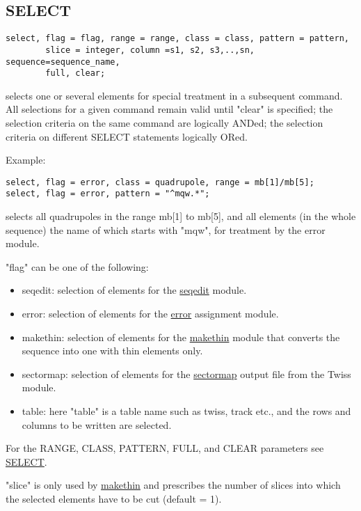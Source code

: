 \subsection{SELECT} %
\begin{verbatim}
select, flag = flag, range = range, class = class, pattern = pattern,
        slice = integer, column =s1, s2, s3,..,sn, sequence=sequence_name,
        full, clear;
\end{verbatim} 
selects one or several elements for special treatment in a subsequent
command. All selections for a given command remain valid until "clear"
is specified; the selection criteria on the same command are logically
ANDed; the selection criteria on different SELECT statements logically
ORed.   

 Example: 
\begin{verbatim}
select, flag = error, class = quadrupole, range = mb[1]/mb[5];
select, flag = error, pattern = "^mqw.*";
\end{verbatim} 
selects all quadrupoles in the range mb[1] to mb[5], and all elements
(in the whole sequence) the name of which starts with "mqw", for
treatment by the error module.  

"flag" can be one of the following: 
\begin{itemize}
   \item seqedit: selection of elements for the
     \href{seqedit.html}{seqedit} module.  
   \item error: selection of elements for the
     \href{../error/error.html}{error} assignment module.  
   \item makethin: selection of elements for the
     \href{../makethin/makethin.html}{makethin} module that
     converts the sequence into one with thin elements only.  
   \item sectormap: selection of elements for the
     \href{../Introduction/sectormap.html}{sectormap} output file
     from the Twiss module.  
   \item table: here "table" is a table name such as twiss, track
     etc., and the rows and columns to be written are selected.  
\end{itemize} 

For the RANGE, CLASS, PATTERN, FULL, and CLEAR parameters
see \href{../Introduction/select.html}{SELECT}.  

"slice" is only used by \href{../makethin/makethin.html}{makethin} and
prescribes the number of slices into which the selected elements have to
be cut (default = 1).  


